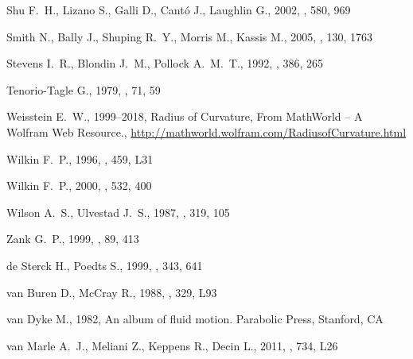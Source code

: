 \documentclass[useAMS, usenatbib, a4paper]{mnras}
\begin{document}
\begin{thebibliography}{}
{Shu} F.~H.,  {Lizano} S.,  {Galli} D.,  {Cant{\'o}} J.,   {Laughlin} G.,
  2002, \apj, 580, 969

{Smith} N.,  {Bally} J.,  {Shuping} R.~Y.,  {Morris} M.,   {Kassis} M.,  2005,
  \aj, 130, 1763

{Stevens} I.~R.,  {Blondin} J.~M.,   {Pollock} A.~M.~T.,  1992, \apj, 386, 265

{Tenorio-Tagle} G.,  1979, \aap, 71, 59

Weisstein E.~W.,  1999--2018, Radius of Curvature, From MathWorld -- A Wolfram
  Web Resource., \url {http://mathworld.wolfram.com/RadiusofCurvature.html}

{Wilkin} F.~P.,  1996, \apjl, 459, L31

{Wilkin} F.~P.,  2000, \apj, 532, 400

{Wilson} A.~S.,  {Ulvestad} J.~S.,  1987, \apj, 319, 105

{Zank} G.~P.,  1999, \ssr, 89, 413

{de Sterck} H.,  {Poedts} S.,  1999, \aap, 343, 641

{van Buren} D.,  {McCray} R.,  1988, \apjl, 329, L93

{van Dyke} M.,  1982, {An album of fluid motion}.
Parabolic Press, Stanford, CA

{van Marle} A.~J.,  {Meliani} Z.,  {Keppens} R.,   {Decin} L.,  2011, \apjl,
  734, L26

\makeatother
\end{thebibliography}
 
\end{document}
